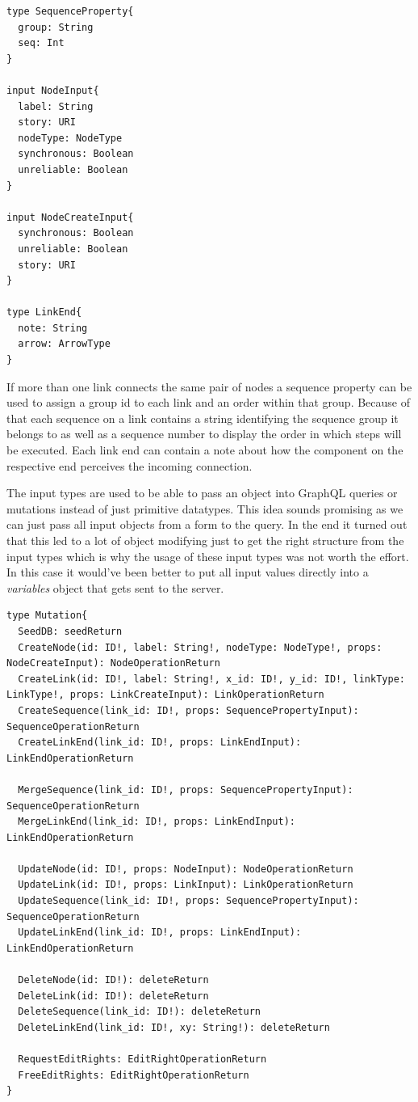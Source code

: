 \begin{lstlisting}[caption={Input Type Definitions}]
type SequenceProperty{
  group: String
  seq: Int
}

input NodeInput{
  label: String
  story: URI
  nodeType: NodeType
  synchronous: Boolean
  unreliable: Boolean
}

input NodeCreateInput{
  synchronous: Boolean
  unreliable: Boolean
  story: URI
}

type LinkEnd{
  note: String
  arrow: ArrowType
}
\end{lstlisting}
If more than one link connects the same pair of nodes a sequence property can be used to assign a group id to each link and an order within that group. Because of that each sequence on a link contains a string identifying the sequence group it belongs to as well as a sequence number to display the order in which steps will be executed. Each link end can contain a note about how the component on the respective end perceives the incoming connection.

The input types are used to be able to pass an object into GraphQL queries or mutations instead of just primitive datatypes. This idea sounds promising as we can just pass all input objects from a form to the query. In the end it turned out that this led to a lot of object modifying just to get the right structure from the input types which is why the usage of these input types was not worth the effort. In this case it would've been better to put all input values directly into a \emph{variables} object that gets sent to the server.

\newpage
\begin{lstlisting}[caption={Mutation Type Definition},label={mutations}]
type Mutation{
  SeedDB: seedReturn
  CreateNode(id: ID!, label: String!, nodeType: NodeType!, props: NodeCreateInput): NodeOperationReturn
  CreateLink(id: ID!, label: String!, x_id: ID!, y_id: ID!, linkType: LinkType!, props: LinkCreateInput): LinkOperationReturn
  CreateSequence(link_id: ID!, props: SequencePropertyInput): SequenceOperationReturn
  CreateLinkEnd(link_id: ID!, props: LinkEndInput): LinkEndOperationReturn

  MergeSequence(link_id: ID!, props: SequencePropertyInput): SequenceOperationReturn
  MergeLinkEnd(link_id: ID!, props: LinkEndInput): LinkEndOperationReturn

  UpdateNode(id: ID!, props: NodeInput): NodeOperationReturn
  UpdateLink(id: ID!, props: LinkInput): LinkOperationReturn
  UpdateSequence(link_id: ID!, props: SequencePropertyInput): SequenceOperationReturn
  UpdateLinkEnd(link_id: ID!, props: LinkEndInput): LinkEndOperationReturn

  DeleteNode(id: ID!): deleteReturn
  DeleteLink(id: ID!): deleteReturn
  DeleteSequence(link_id: ID!): deleteReturn
  DeleteLinkEnd(link_id: ID!, xy: String!): deleteReturn

  RequestEditRights: EditRightOperationReturn
  FreeEditRights: EditRightOperationReturn
}
\end{lstlisting}

